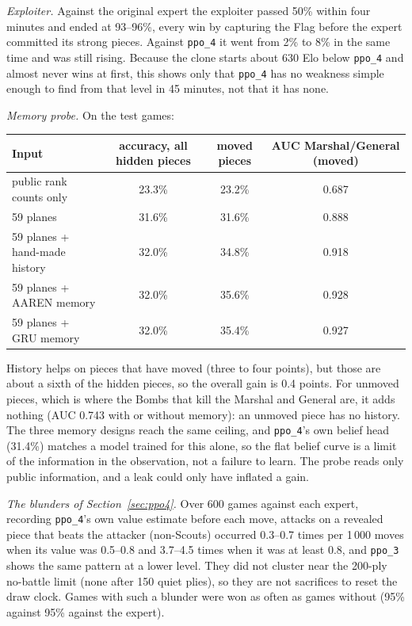 \emph{Exploiter.} Against the original expert the exploiter passed 50\% within four minutes and
ended at 93--96\%, every win by capturing the Flag before the expert committed its strong pieces.
Against \texttt{ppo\_4} it went from 2\% to 8\% in the same time and was still rising. Because the
clone starts about 630 Elo below \texttt{ppo\_4} and almost never wins at first, this shows only that
\texttt{ppo\_4} has no weakness simple enough to find from that level in 45 minutes, not that it has
none.

\emph{Memory probe.} On the test games:
\begin{center}
\small
\begin{tabular}{lccc}
\toprule
Input & accuracy, all hidden pieces & moved pieces & AUC Marshal/General (moved) \\
\midrule
public rank counts only        & 23.3\% & 23.2\% & 0.687 \\
59 planes                      & 31.6\% & 31.6\% & 0.888 \\
59 planes + hand-made history  & 32.0\% & 34.8\% & 0.918 \\
59 planes + AAREN memory       & 32.0\% & 35.6\% & 0.928 \\
59 planes + GRU memory         & 32.0\% & 35.4\% & 0.927 \\
\bottomrule
\end{tabular}
\end{center}
History helps on pieces that have moved (three to four points), but those are about a sixth of the
hidden pieces, so the overall gain is 0.4 points. For unmoved pieces, which is where the Bombs that
kill the Marshal and General are, it adds nothing (AUC 0.743 with or without memory): an unmoved
piece has no history. The three memory designs reach the same ceiling, and \texttt{ppo\_4}'s own
belief head (31.4\%) matches a model trained for this alone, so the flat belief curve is a limit
of the information in the observation, not a failure to learn. The probe reads only public
information, and a leak could only have inflated a gain.

\emph{The blunders of Section~\ref{sec:ppo4}.} Over 600 games against each expert, recording
\texttt{ppo\_4}'s own value estimate before each move, attacks on a revealed piece that beats the
attacker (non-Scouts) occurred 0.3--0.7 times per 1\,000 moves when its value was 0.5--0.8 and
3.7--4.5 times when it was at least 0.8, and \texttt{ppo\_3} shows the same pattern at a lower
level. They did not cluster near the 200-ply no-battle limit (none after 150 quiet plies), so they
are not sacrifices to reset the draw clock. Games with such a blunder were won as often as games
without (95\% against 95\% against the expert).

